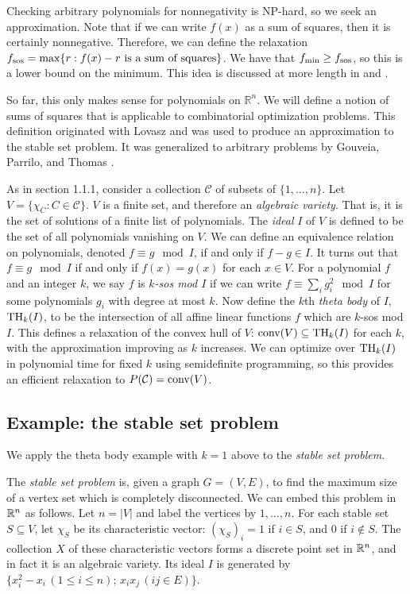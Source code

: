 Checking arbitrary polynomials for nonnegativity is NP-hard, so we seek an approximation.
Note that if we can write $f(x)$ as a sum of squares, then it is certainly nonnegative. 
Therefore, we can define the relaxation $f_{\textup{sos}} = \max \{r: f(x) - r \textup{ is a sum of squares}\}$.
We have that $f_{\min} \ge f_{\textup{sos}}$, so this is a lower bound on the minimum. 
This idea is discussed at more length in \cite{sostools} and \cite{lasserre}. 

So far, this only makes sense for polynomials on $\mathbb{R}^n$.
We will define a notion of sums of squares that is applicable to combinatorial optimization problems.
This definition originated with Lovasz \cite{lovasz} and was used to produce an approximation to the stable set problem.
It was generalized to arbitrary problems by Gouveia, Parrilo, and Thomas \cite{gpt}.

As in section 1.1.1, consider a collection $\mathcal{C}$ of subsets of $\{1, \ldots, n\}$. 
Let $V = \{\chi_C: C \in \mathcal{C}\}$.
$V$ is a finite set, and therefore an {\em algebraic variety}.
That is, it is the set of solutions of a finite list of polynomials.
The {\em ideal} $I$ of $V$ is defined to be the set of all polynomials vanishing on $V$.
We can define an equivalence relation on polynomials, denoted $f \equiv g \mod I$, if and only if $f - g \in I$.
It turns out that $f \equiv g \mod I$ if and only if $f(x) = g(x)$ for each $x \in V$.
For a polynomial $f$ and an integer $k$, we say $f$ is {\em $k$-sos mod $I$} if we can write $f \equiv \sum_i g_i^2 \mod I$ for some polynomials $g_i$ with degree at most $k$.
Now define the $k$th {\em theta body} of $I$, $\textup{TH}_k(I)$, to be the intersection of all affine linear functions $f$ which are $k$-sos mod $I$. 
This defines a relaxation of the convex hull of $V$: $\hbox{conv}(V) \subseteq \textup{TH}_k(I)$ for each $k$, with the approximation improving as $k$ increases.
We can optimize over $\textup{TH}_k(I)$ in polynomial time for fixed $k$ using semidefinite programming, so this provides an efficient relaxation to $P(\mathcal{C}) = \hbox{conv}(V)$.

\subsection{Example: the stable set problem}
We apply the theta body example with $k=1$ above to the {\em stable set problem}.

The {\em stable set problem} is, given a graph $G = (V,E)$, to find the maximum size of a vertex set which is completely disconnected. 
We can embed this problem in $\mathbb{R}^n$ as follows. 
Let $n = |V|$ and label the vertices by $1, \ldots, n$. 
For each stable set $S \subseteq V$, let $\chi_S$ be its characteristic vector: $(\chi_S)_i = 1$ if $i \in S$, and 0 if $i \notin S$.
The collection $X$ of these characteristic vectors forms a discrete point set in $\mathbb{R}^n$, and in fact it is an algebraic variety. 
Its ideal $I$ is generated by $\{x_i^2 - x_i \, (1\le i \le n);\, x_ix_j\, (ij \in E) \}$.

